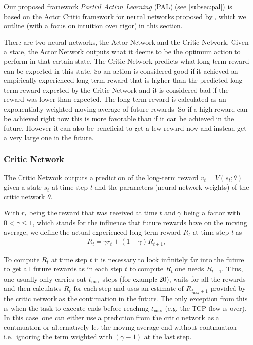 \documentclass[newfonts=false,format=sigconf,10pt,letterpaper]{acmart}
\begin{document}
Our proposed framework \textit{Partial Action Learning} (PAL) (see \ref{subsec:pal}) is based on the Actor Critic framework for neural networks proposed by \citet{mnih_asynchronous_2016}, which we outline (with a focus on intuition over rigor) in this section. 

There are two neural networks, the Actor Network and the Critic Network. Given a state, the Actor Network outputs what it deems to be the optimum action to perform in that certain state. The Critic Network predicts what long-term reward can be expected in this state. So an action is considered good if it achieved an empirically experienced long-term reward that is higher than the predicted long-term reward expected by the Critic Network and it is considered bad if the reward was lower than expected. The long-term reward is calculated as an exponentially weighted moving average of future rewards. So if a high reward can be achieved right now this is more favorable than if it can be achieved in the future. However it can also be beneficial to get a low reward now and instead get a very large one in the future. 

\subsubsection{Critic Network}
\label{subsubsec:genericvalue}

The Critic Network outputs a prediction of the long-term reward $v_t = V(s_{t}; \theta)$ given a state $s_t$ at time step $t$ and the parameters (neural network weights) of the critic network $\theta$.

With $r_t$ being the reward that was received at time $t$ and $\gamma$ being a factor with $0 < \gamma \leq 1$, which stands for the influence that future rewards have on the moving average, we define the actual experienced long-term reward $R_t$ at time step $t$ as 
\begin{align}
R_t = \gamma r_{t} + (1-\gamma) R_{t+1} ,
\end{align}

To compute $R_t$ at time step $t$ it is necessary to look infinitely far into the future to get all future rewards as in each step $t$ to compute $R_t$ one needs $R_{t+1}$. Thus, one usually only carries out $t_\text{max}$ steps (for example 20), waits for all the rewards and then calculates $R_t$ for each step and uses an estimate of $R_{t_\text{max}+1}$ provided by the critic network as the continuation in the future. The only exception from this is when the task to execute ends before reaching $t_\text{max}$ (e.g. the TCP flow is over). In this case, one can either use a prediction from the critic network as a continuation or alternatively let the moving average end without continuation i.e.~ignoring the term weighted with $(\gamma-1)$ at the last step. 
\end{document}
